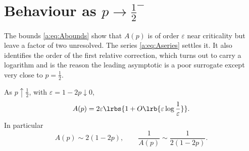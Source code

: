 \section{Behaviour as \texorpdfstring{$p\to\tfrac12^-$}{p to 1/2}}
\label{a:sec:nearcritical}

The bounds \cref{a:eq:Abounds} show that $A(p)$ is of order $\varepsilon$ near
criticality but leave a factor of two unresolved. The series \cref{a:eq:Aseries}
settles it. It also identifies the order of the first relative correction,
which turns out to carry a logarithm and is the reason the leading asymptotic is a
poor surrogate except very close to $p=\tfrac12$.

\begin{theorem}
\label{a:thm:nearcritical}
As $p\uparrow\tfrac12$, with $\varepsilon = 1-2p\downarrow0$,
\begin{equation}
\label{a:eq:Anearcritical}
A(p) = 2\varepsilon\lrbs{1+O\lrb{\varepsilon\log\frac1\varepsilon}} .
\end{equation}
In particular
\begin{equation}
\label{a:eq:Aasym}
A(p)\sim2(1-2p),
\qquad
\frac{1}{A(p)}\sim\frac{1}{2(1-2p)} .
\end{equation}
\end{theorem}

